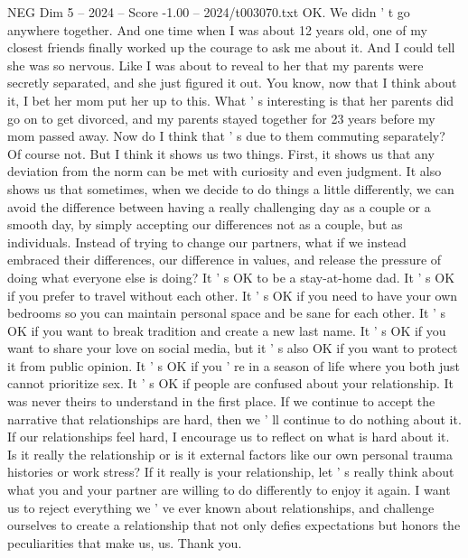 \begin{textsample}{NEG Dim 5 – 2024 – Score -1.00 – 2024/t003070.txt}
OK.
We didn ' t go anywhere together.
And one time when I was about 12 years old, one of my closest friends finally worked up the courage to ask me about it.
And I could tell she was so nervous.
Like I was about to reveal to her that my parents were secretly separated, and she just figured it out.
You know, now that I think about it, I bet her mom put her up to this.
What ' s interesting is that her parents did go on to get divorced, and my parents stayed together for 23 years before my mom passed away.
Now do I think that ' s due to them commuting separately?
Of course not.
But I think it shows us two things.
First, it shows us that any deviation from the norm can be met with curiosity and even judgment.
It also shows us that sometimes, when we decide to do things a little differently, we can avoid the difference between having a really challenging day as a couple or a smooth day, by simply accepting our differences not as a couple, but as individuals.
Instead of trying to change our partners, what if we instead embraced their differences, our difference in values, and release the pressure of doing what everyone else is doing?
It ' s OK to be a stay-at-home dad.
It ' s OK if you prefer to travel without each other.
It ' s OK if you need to have your own bedrooms so you can maintain personal space and be sane for each other.
It ' s OK if you want to break tradition and create a new last name.
It ' s OK if you want to share your love on social media, but it ' s also OK if you want to protect it from public opinion.
It ' s OK if you ' re in a season of life where you both just cannot prioritize sex.
It ' s OK if people are confused about your relationship.
It was never theirs to understand in the first place.
If we continue to accept the narrative that relationships are hard, then we ' ll continue to do nothing about it.
If our relationships feel hard, I encourage us to reflect on what is hard about it.
Is it really the relationship or is it external factors like our own personal trauma histories or work stress?
If it really is your relationship, let ' s really think about what you and your partner are willing to do differently to enjoy it again.
I want us to reject everything we ' ve ever known about relationships, and challenge ourselves to create a relationship that not only defies expectations but honors the peculiarities that make us, us.
Thank you.

\end{textsample}
